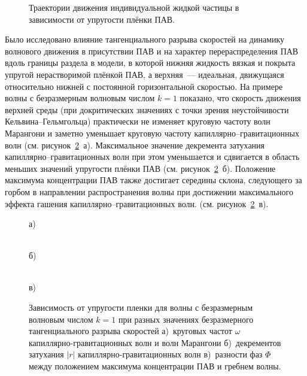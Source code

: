 \begin{figure}[ht]
	\caption{Траектории движения индивидуальной жидкой частицы в зависимости от упругости плёнки ПАВ.}
	\label{ris:Fig8}
\end{figure}

Было исследовано влияние тангенциального разрыва скоростей на динамику волнового движения в присутствии ПАВ и на характер перераспределения ПАВ вдоль границы раздела в модели, в которой нижняя жидкость вязкая и покрыта упругой нерастворимой плёнкой ПАВ, а верхняя~--- идеальная, движущаяся относительно нижней с постоянной горизонтальной скоростью. На примере волны с безразмерным волновым числом  $ k=1 $ показано, что скорость движения верхней среды (при  докритических значениях с точки зрения неустойчивости Кельвина--Гельмгольца) практически не изменяет круговую частоту волн Марангони и заметно уменьшает круговую частоту капиллярно--гравитационных волн (см. рисунок~\ref{ris:Fig9}~а). Максимальное значение декремента затухания капиллярно--гравитационных волн при этом уменьшается и сдвигается в область меньших значений упругости плёнки ПАВ (см. рисунок~\ref{ris:Fig9}~б). Положение максимума концентрации ПАВ также достигает середины склона, следующего за горбом в направлении распространения волны при достижении максимального эффекта гашения капиллярно--гравитационных волн. (см. рисунок~\ref{ris:Fig9}~в).

\begin{figure}[ht]
	\begin{minipage}[h]{0.47\linewidth}
		 а) \\
	\end{minipage}
	\hfill
	\begin{minipage}[h]{0.47\linewidth}
		 \\б)
	\end{minipage}
	\vfill
	 \\в) \\
	\caption{Зависимость от упругости пленки для волны с безразмерным волновым числом $ k=1 $ при разных значениях безразмерного тангенциального разрыва скоростей а)~круговых частот $ \omega $ капиллярно-гравитационных волн и волн Марангони б)~декрементов затухания $ |r| $ капиллярно-гравитационных волн в)~разности фаз $ \Phi $ между положением максимума концентрации ПАВ и гребнем волны.}
	\label{ris:Fig9}
\end{figure}

